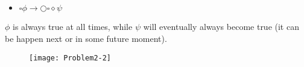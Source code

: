 \subsection{}

\begin{itemize}
   \item[] $\square \phi \rightarrow \bigcirc \square \diamond \psi$ 
\end{itemize}

\indent $\phi$ is always true at all times, while $\psi$ will eventually always become true (it can be happen next or in some future moment).

\begin{figure}[h!]
	\centering \texttt{[image: Problem2-2]}
\end{figure}